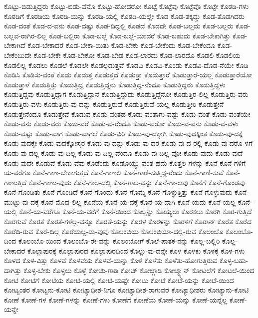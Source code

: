 {ಕೊಟ್ಟು-ಬಿಡುತ್ತಿದ್ದರು
ಕೊಟ್ಟು-ಬಿಡು-ವೆನೊ
ಕೊಟ್ಟು-ಹೋದರೋ
ಕೊಟ್ಟೆ
ಕೊಟ್ಟೆವು
ಕೊಟ್ಟೆವೊ
ಕೊಟ್ಟೇ
ಕೊಠಡಿ-ಗಳು
ಕೊಠಡಿಗೆ
ಕೊಠಡಿಯ
ಕೊಠಡಿ-ಯನ್ನು
ಕೊಠಡಿ-ಯಲ್ಲಿ
ಕೊಠಡಿ-ಯಲ್ಲೇ
ಕೊಡ
ಕೊಡ-ತಕ್ಕದ್ದು
ಕೊಡ-ತೊಡಗಿದರು
ಕೊಡ-ದಂತೆ
ಕೊಡ-ದ-ವನು
ಕೊಡ-ದಷ್ಟು
ಕೊಡ-ದಿದ್ದಲ್ಲಿ
ಕೊಡದೆ
ಕೊಡದೇ
ಕೊಡ-ಬಲ್ಲದು
ಕೊಡ-ಬಲ್ಲರು
ಕೊಡ-ಬಲ್ಲವ-ರಾಗಿರ-ಲಿಲ್ಲ
ಕೊಡ-ಬಲ್ಲಿರಾ
ಕೊಡ-ಬಲ್ಲೆ
ಕೊಡ-ಬಲ್ಲೆ-ಯಾದರೆ
ಕೊಡ-ಬಹುದು
ಕೊಡ-ಬೇಕಾಗಿತ್ತು
ಕೊಡ-ಬೇಕಾಗಿದೆ
ಕೊಡ-ಬೇಕಾದರೆ
ಕೊಡ-ಬೇಕಾ-ಯಿತು
ಕೊಡ-ಬೇಕು
ಕೊಡ-ಬೇಕೆಂದು
ಕೊಡ-ಬೇಕೆಂದೂ
ಕೊಡ-ಬೇಕೆಂಬುದೇ
ಕೊಡ-ಬೇಕೇ
ಕೊಡ-ಬೇಕೋ
ಕೊಡ-ಬೇಡ
ಕೊಡ-ಲಾರದು
ಕೊಡ-ಲಾರದೊ
ಕೊಡಲಿ
ಕೊಡಲಿಯ
ಕೊಡಲಿಲ್ಲ
ಕೊಡಲು
ಕೊಡಲೆ
ಕೊಡಲೇ
ಕೊಡಲ್ಪಡುತ್ತವೆ
ಕೊಡವಿ
ಕೊಡವಿ-ಕೊಂಡು
ಕೊಡವಿ-ದೊಡ-ನೆಯೇ
ಕೊಡಿ
ಕೊಡಿಸಿ
ಕೊಡಿಸು-ವಂತೆ
ಕೊಡು
ಕೊಡುತ್ತ
ಕೊಡುತ್ತದೆ
ಕೊಡುತ್ತಾ
ಕೊಡುತ್ತಾರೆ
ಕೊಡುತ್ತಾರೆ-ಯಲ್ಲ
ಕೊಡುತ್ತಾರೆಯೋ
ಕೊಡುತ್ತಾಳೆ
ಕೊಡುತ್ತಿತ್ತು
ಕೊಡುತ್ತಿದ್ದ
ಕೊಡುತ್ತಿದ್ದನು
ಕೊಡುತ್ತಿದ್ದ-ನೆಂದೂ
ಕೊಡುತ್ತಿದ್ದರು
ಕೊಡುತ್ತಿದ್ದಳು
ಕೊಡುತ್ತಿದ್ದವು
ಕೊಡುತ್ತಿದ್ದಾಗ
ಕೊಡುತ್ತಿದ್ದಾನೆ
ಕೊಡುತ್ತಿದ್ದುದು
ಕೊಡುತ್ತಿದ್ದೆನೋ
ಕೊಡುತ್ತಿರ-ಲಿಲ್ಲ
ಕೊಡುತ್ತಿರು-ವರು
ಕೊಡುತ್ತಿರು-ವಳು
ಕೊಡುತ್ತಿರು-ವು-ದನ್ನು
ಕೊಡುತ್ತಿರುವೆ
ಕೊಡುತ್ತಿರುವೆ-ಯಲ್ಲ
ಕೊಡುತ್ತೀರಿ
ಕೊಡುತ್ತೇನೆ
ಕೊಡುತ್ತೇನೆಂದೂ
ಕೊಡುತ್ತೇವೆ
ಕೊಡುವ
ಕೊಡು-ವಂತಹ
ಕೊಡು-ವಂತಾಗು-ವಷ್ಟು
ಕೊಡು-ವಂತೆ
ಕೊಡು-ವಂತೆಯೇ
ಕೊಡು-ವನು
ಕೊಡು-ವರು
ಕೊಡು-ವರೆ
ಕೊಡು-ವ-ರೆಂದೂ
ಕೊಡು-ವರೋ
ಕೊಡು-ವ-ವನು
ಕೊಡು-ವ-ವಳು
ಕೊಡು-ವಷ್ಟು
ಕೊಡು-ವಾಗ
ಕೊಡು-ವಾಗಲೆ
ಕೊಡು-ವಿರಿ
ಕೊಡು-ವು-ದಕ್ಕಾಗಿ
ಕೊಡು-ವುದಕ್ಕಿಂತ
ಕೊಡು-ವು-ದಕ್ಕೆ
ಕೊಡು-ವುದಕ್ಕೇ
ಕೊಡು-ವುದಕ್ಕೋಸ್ಕರ
ಕೊಡು-ವು-ದನ್ನು
ಕೊಡು-ವು-ದರ
ಕೊಡು-ವು-ದ-ರಲ್ಲಿ
ಕೊಡು-ವು-ದರೊ-ಳಗೆ
ಕೊಡು-ವು-ದಲ್ಲ
ಕೊಡು-ವು-ದಿಲ್ಲ
ಕೊಡು-ವು-ದಿಲ್ಲ-ವೆಂದೂ
ಕೊಡು-ವು-ದಿಲ್ಲ-ವೋ
ಕೊಡು-ವುದು
ಕೊಡು-ವುದೆ
ಕೊಡು-ವುದೇ
ಕೊಡುವೆ
ಕೊಡು-ವೆವು
ಕೊಡೆಂದು
ಕೊಡೊಯ್ಯು-ವಂತ-ಹದು
ಕೊತ್ತಲ-ಗಳನ್ನು
ಕೊನೆ
ಕೊನೆ-ಗಳಿಗೆ-ಯ-ವರೆಗೂ
ಕೊನೆ-ಗಾಣ-ಬೇಕಾಗುತ್ತದೆ
ಕೊನೆ-ಗಾಣಲಿ
ಕೊನೆ-ಗಾಣಿ-ಸುತ್ತಿದ್ದ-ರೆಂದು
ಕೊನೆ-ಗಾಣಿ-ಸುವೆ
ಕೊನೆ-ಗಾಣುತ್ತಿದೆ
ಕೊನೆ-ಗಾಣು-ವುದು
ಕೊನೆ-ಗಾಲ-ದಲ್ಲಿ
ಕೊನೆ-ಗಾಲ-ವನ್ನು
ಕೊನೆ-ಗಾ-ಲವು
ಕೊನೆಗೆ
ಕೊನೆ-ಗೊಂಡವು
ಕೊನೆ-ಗೊಂಡಿತು
ಕೊನೆ-ಗೊಂಡಿದೆ
ಕೊನೆ-ಗೊಂದು
ಕೊನೆ-ಗೊಮ್ಮೆ
ಕೊನೆ-ಗೊಳ್ಳುತ್ತಿತ್ತು
ಕೊನೆ-ಗೊಳ್ಳುವುದು
ಕೊನೆ-ಮುಟ್ಟು-ವು-ದಕ್ಕೆ
ಕೊನೆ-ಮೊದ-ಲಿಲ್ಲ
ಕೊನೆಯ
ಕೊನೆ-ಯ-ದಕ್ಕೆ
ಕೊನೆ-ಯ-ದಾಗಿ
ಕೊನೆ-ಯದು
ಕೊನೆ-ಯಲ್ಲ
ಕೊನೆ-ಯಲ್ಲಿ
ಕೊನೆ-ಯ-ವರೆಗೂ
ಕೊನೆ-ಯ-ವರೆಗೆ
ಕೊನೆ-ಯಿಂದ
ಕೊಬ್ಬನ್ನು
ಕೊಯ್ಯಲು
ಕೊರಕಲು
ಕೊರಗಿ
ಕೊರ-ಗುತ್ತಿದೆ
ಕೊರಗುವೆ
ಕೊರತೆ
ಕೊರತೆ-ಗಳೆಲ್ಲ-ವನ್ನೂ
ಕೊರತೆ-ಯನ್ನು
ಕೊರಳ
ಕೊರಳನ್ನು
ಕೊರಳಿಗೆ
ಕೊರಾನ್
ಕೊರೆತ
ಕೊರೆದ
ಕೊರೆದಿ-ರುವ
ಕೊರೆ-ದಿಲ್ಲ
ಕೊರೆಯಲ್ಪ-ಡು-ವುವು
ಕೊಲಂಬಿಯ
ಕೊಲಂಬಿಯಾ-ದಲ್ಲಿ-ರುವ
ಕೊಲಂಬೊ
ಕೊಲಂಬೊ-ದಿಂದ
ಕೊಲಂಬೊ-ಯಿಂದ
ಕೊಲಂಬೊ-ರೇ-ವನ್ನು
ಕೊಲಂಬೋಗೆ
ಕೊಲೆ-ಪಾತಕ-ನನ್ನು
ಕೊಲ್ಲ-ಬಲ್ಲಿರಿ
ಕೊಲ್ಲ-ಬೇಕಾದರೆ
ಕೊಲ್ಲಾಪುರಕ್ಕೆ
ಕೊಲ್ಲಾಪುರದ
ಕೊಲ್ಲಾಪುರದಿಂದ
ಕೊಲ್ಲು-ವು-ದನ್ನೇ
ಕೊಳ
ಕೊಳಕು
ಕೊಳಕ್ಕೆ
ಕೊಳ-ಗಳು
ಕೊಳದ
ಕೊಳ-ವಿತ್ತು
ಕೊಳವೆ
ಕೊಳವೆಯ
ಕೊಳವೆ-ಯನ್ನು
ಕೊಳೆ
ಕೊಳೆತು
ಕೊಳೆತು-ಹೋಗುತ್ತಿರುವ
ಕೊಳ್ಳ-ಬಹು-ದಾಗಿತ್ತು
ಕೊಳ್ಳ-ಬೇಕು
ಕೊಳ್ಳಲು
ಕೊಳ್ಳೆ
ಕೋಚು-ಗಾಡಿ
ಕೋಚ್
ಕೋಚ್ಗಾಡಿ
ಕೋಚ್ಮ್ಯಾನ್
ಕೋಟಲೆಗೆ
ಕೋಟಲೆ-ಯಿಂದ
ಕೋಟಿ
ಕೋಟಿಗೆ
ಕೋಟಿಯ
ಕೋಟಿ-ಯಲ್ಲಿ
ಕೋಟಿ-ಯಷ್ಟೇ
ಕೋಟು
ಕೋಟೆ
ಕೋಟೆ-ಯನ್ನು
ಕೋಟೆ-ಯಿಂದ
ಕೋಟ್ಯಂತರ
ಕೋಟ್ಯನು-ಕೋಟಿ
ಕೋಟ್ಯಾಧೀಶ-ನಿಗೂ
ಕೋಟ್ಯಾಧೀಶ-ರಾಗುವರೆ
ಕೋಟ್ಯಾಧೀಶರು
ಕೋಟ್ಯಾನು-ಕೋಟಿ
ಕೋಣೆ
ಕೋಣೆ-ಗಳ
ಕೋಣೆ-ಗಳನ್ನು
ಕೋಣೆ-ಗಳು
ಕೋಣೆಗೆ
ಕೋಣೆಯ
ಕೋಣೆ-ಯನ್ನು
ಕೋಣೆ-ಯನ್ನೆಲ್ಲ
ಕೋಣೆ-ಯನ್ನೇ
}
